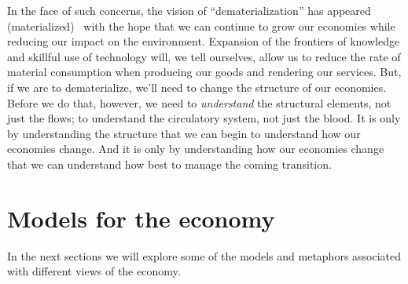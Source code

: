 In the face of such concerns,
the vision of ``dematerialization'' 
has appeared (materialized)~\cite{Bernardini1993, Wernick1996, Cleveland1998}
with the hope that we can continue to grow our economies
while reducing our impact on the environment.
Expansion of the frontiers of knowledge and skillful use of technology will,
we tell ourselves, 
allow us to reduce the rate of material consumption 
when producing our goods and rendering our services.
But, if we are to dematerialize, 
we'll need to change the structure of our economies.
Before we do that, however, we need to \emph{understand}
the structural elements,
not just the flows;
to understand the circulatory system,
not just the blood.
It is only by understanding the structure that we can 
begin to understand how our economies change.
And it is only by understanding how our economies change
that we can understand how best to manage the coming
transition.

\section{Models for the economy}
\label{sec:metaphors}


In the next sections we will explore some of the
models and metaphors associated with different
views of the economy.

